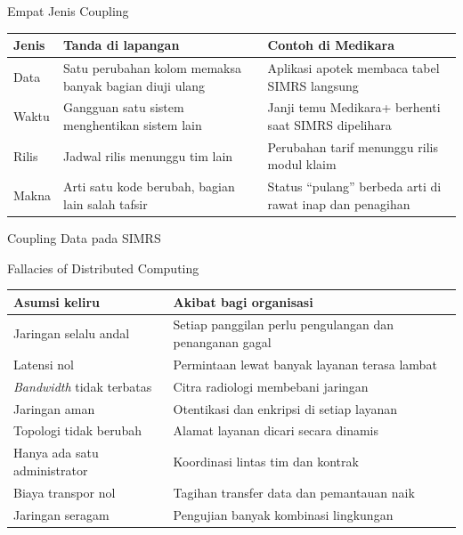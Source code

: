 \documentclass[aspectratio=169, table, 12pt]{beamer}
\begin{document}
\begin{frame}{{\Large Empat Jenis Coupling}}
  \footnotesize
  \begin{tabularx}{\textwidth}{>{\raggedright\arraybackslash}p{1.6cm}
      >{\raggedright\arraybackslash}X >{\raggedright\arraybackslash}X}
    \hline
    \textbf{Jenis} & \textbf{Tanda di lapangan} & \textbf{Contoh di Medikara} \\
    \hline
    Data & Satu perubahan kolom memaksa banyak bagian diuji ulang & Aplikasi apotek membaca
      tabel SIMRS langsung \\
    \hline
    Waktu & Gangguan satu sistem menghentikan sistem lain & Janji temu Medikara+ berhenti saat
      SIMRS dipelihara \\
    \hline
    Rilis & Jadwal rilis menunggu tim lain & Perubahan tarif menunggu rilis modul klaim \\
    \hline
    Makna & Arti satu kode berubah, bagian lain salah tafsir & Status ``pulang'' berbeda arti di
      rawat inap dan penagihan \\
    \hline
  \end{tabularx}
\end{frame}

\begin{frame}{{\Large Coupling Data pada SIMRS}}
  \centering
\end{frame}

\begin{frame}{{\Large Fallacies of Distributed Computing}}
  \footnotesize
  \begin{tabularx}{\textwidth}{>{\raggedright\arraybackslash}p{4.2cm}
      >{\raggedright\arraybackslash}X}
    \hline
    \textbf{Asumsi keliru} & \textbf{Akibat bagi organisasi} \\
    \hline
    Jaringan selalu andal & Setiap panggilan perlu pengulangan dan penanganan gagal \\
    \hline
    Latensi nol & Permintaan lewat banyak layanan terasa lambat \\
    \hline
    \textit{Bandwidth} tidak terbatas & Citra radiologi membebani jaringan \\
    \hline
    Jaringan aman & Otentikasi dan enkripsi di setiap layanan \\
    \hline
    Topologi tidak berubah & Alamat layanan dicari secara dinamis \\
    \hline
    Hanya ada satu administrator & Koordinasi lintas tim dan kontrak \\
    \hline
    Biaya transpor nol & Tagihan transfer data dan pemantauan naik \\
    \hline
    Jaringan seragam & Pengujian banyak kombinasi lingkungan \\
    \hline
  \end{tabularx}
\end{frame}
\end{document}
